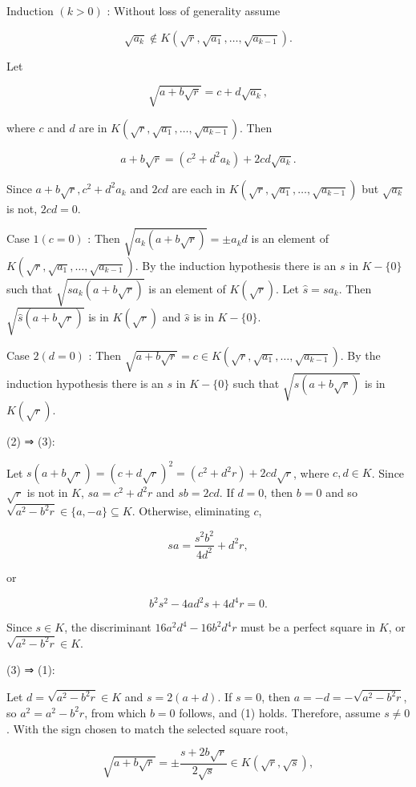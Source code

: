 \documentclass[11pt,letterpaper]{article}
\begin{document}
Induction $(k>0)$ : Without loss of generality assume

\[
\sqrt{a_{k}} \notin K\left(\sqrt{r}, \sqrt{a_{1}}, \ldots, \sqrt{a_{k-1}}\right) .
\]

Let

\[
\sqrt{a+b \sqrt{r}}=c+d \sqrt{a_{k}},
\]

where $c$ and $d$ are in $K\left(\sqrt{r}, \sqrt{a_{1}}, \ldots, \sqrt{a_{k-1}}\right)$. Then

\[
a+b \sqrt{r}=\left(c^{2}+d^{2} a_{k}\right)+2 c d \sqrt{a_{k}} .
\]

Since $a+b \sqrt{r}, c^{2}+d^{2} a_{k}$ and $2 c d$ are each in $K\left(\sqrt{r}, \sqrt{a_{1}}, \ldots, \sqrt{a_{k-1}}\right)$ but $\sqrt{a_{k}}$ is not, $2 c d=0$.

Case $1(c=0)$ : Then $\sqrt{a_k(a+b\sqrt r)}=\pm a_kd$ is an element of $K\left(\sqrt{r}, \sqrt{a_{1}}, \ldots, \sqrt{a_{k-1}}\right)$. By the induction hypothesis there is an $s$ in $K-\{0\}$ such that $\sqrt{s a_{k}(a+b \sqrt{r})}$ is an element of $K(\sqrt{r})$. Let $\hat{s}=s a_{k}$. Then $\sqrt{\hat{s}(a+b \sqrt{r})}$ is in $K(\sqrt{r})$ and $\hat{s}$ is in $K-\{0\}$.

Case $2(d=0)$ : Then $\sqrt{a+b \sqrt{r}}=c \in K\left(\sqrt{r}, \sqrt{a_{1}}, \ldots, \sqrt{a_{k-1}}\right)$. By the induction hypothesis there is an $s$ in $K-\{0\}$ such that $\sqrt{s(a+b \sqrt{r})}$ is in $K(\sqrt{r})$.

(2) ⇒ (3):

Let $s(a+b \sqrt{r})=(c+d \sqrt{r})^{2}=\left(c^{2}+d^{2} r\right)+2 c d \sqrt{r}$, where $c, d \in K$. Since $\sqrt{r}$ is not in $K$, $s a=c^{2}+d^{2} r$ and $s b=2 c d$. If $d=0$, then $b=0$ and so $\sqrt{a^2-b^2r}\in\{a,-a\}\subseteq K$. Otherwise, eliminating $c$,

\[
s a=\frac{s^{2} b^{2}}{4 d^{2}}+d^{2} r,
\]

or

\[
b^{2} s^{2}-4 a d^{2} s+4 d^{4} r=0 .
\]

Since $s \in K$, the discriminant $16 a^{2} d^{4}-16 b^{2} d^{4} r$ must be a perfect square in $K$, or $\sqrt{a^{2}-b^{2} r} \in K$.

(3) ⇒ (1):

Let $d=\sqrt{a^{2}-b^{2} r} \in K$ and $s=2(a+d)$. If $s=0$, then $a=-d=-\sqrt{a^{2}-b^{2} r}$, so $a^{2}=a^{2}-b^{2} r$, from which $b=0$ follows, and (1) holds. Therefore, assume $s\ne0$. With the sign chosen to match the selected square root,

\[
\sqrt{a+b\sqrt r}=\pm\frac{s+2b\sqrt r}{2\sqrt s}\in K(\sqrt r,\sqrt s),
\]
\end{document}
